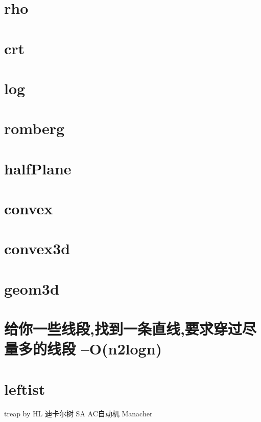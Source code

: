 \documentclass[
	10pt,
	twocolumn,
	a4paper,
]{article}
\begin{document}
\section{rho}

\section{crt}

\section{log}

\section{romberg}

\section{halfPlane}

\section{convex}

\section{convex3d}

\section{geom3d}

\section{给你一些线段,找到一条直线,要求穿过尽量多的线段 –O(n2logn)}

\section{leftist}


treap by HL
迪卡尔树
SA
AC自动机
Manacher
\end{document}
